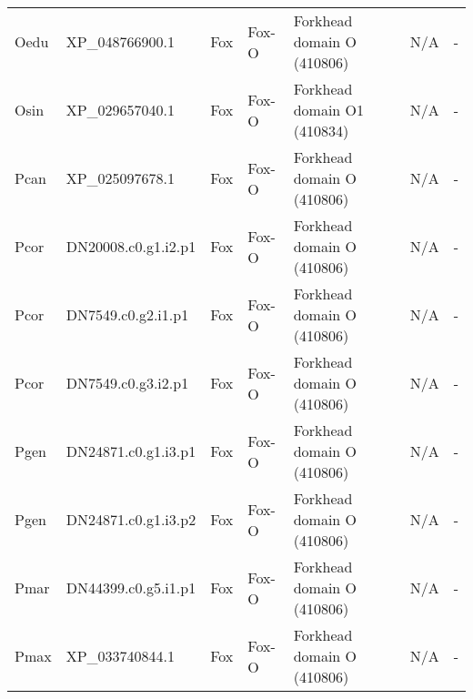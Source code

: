 \documentclass[../main.tex]{subfiles}
\begin{document}
\begin{landscape}
\begin{longtable}{lllllll}
		Oedu           & XP\_048766900.1       & Fox            & Fox-O               & Forkhead domain O (410806)                  & N/A                                                                    & -                    \\
		Osin           & XP\_029657040.1       & Fox            & Fox-O               & Forkhead domain O1 (410834)                 & N/A                                                                    & -                    \\
		Pcan           & XP\_025097678.1       & Fox            & Fox-O               & Forkhead domain O (410806)                  & N/A                                                                    & -                    \\
		Pcor           & DN20008.c0.g1.i2.p1   & Fox            & Fox-O               & Forkhead domain O (410806)                  & N/A                                                                    & -                    \\
		Pcor           & DN7549.c0.g2.i1.p1    & Fox            & Fox-O               & Forkhead domain O (410806)                  & N/A                                                                    & -                    \\
		Pcor           & DN7549.c0.g3.i2.p1    & Fox            & Fox-O               & Forkhead domain O (410806)                  & N/A                                                                    & -                    \\
		Pgen           & DN24871.c0.g1.i3.p1   & Fox            & Fox-O               & Forkhead domain O (410806)                  & N/A                                                                    & -                    \\
		Pgen           & DN24871.c0.g1.i3.p2   & Fox            & Fox-O               & Forkhead domain O (410806)                  & N/A                                                                    & -                    \\
		Pmar           & DN44399.c0.g5.i1.p1   & Fox            & Fox-O               & Forkhead domain O (410806)                  & N/A                                                                    & -                    \\
		Pmax           & XP\_033740844.1       & Fox            & Fox-O               & Forkhead domain O (410806)                  & N/A                                                                    & -                    \\

\end{longtable}
\end{landscape}
\end{document}
